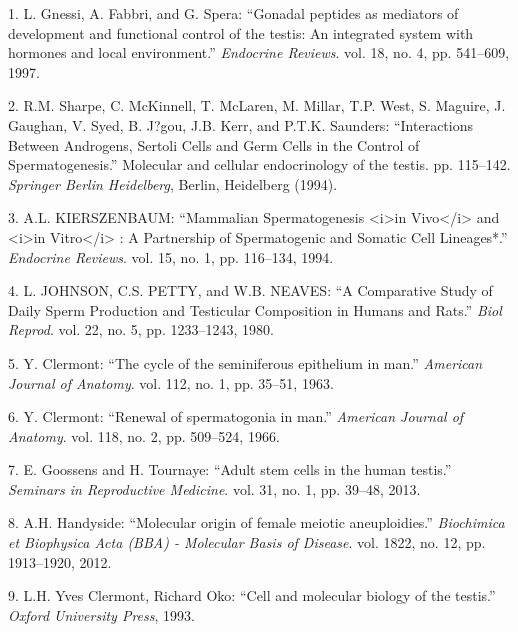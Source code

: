 \documentclass[12pt,twoside]{ugathesis}
\theoremstyle{definition}
\theoremstyle{definition}
\theoremstyle{remark}
\begin{document}
\noindent

\setlength{\parindent}{-0.20in} \setlength{\leftskip}{0.20in}
\setlength{\parskip}{8pt}

\hypertarget{refs}{}
\hypertarget{ref-Gnessi1997}{}
1. L. Gnessi, A. Fabbri, and G. Spera: ``Gonadal peptides as mediators
of development and functional control of the testis: An integrated
system with hormones and local environment.'' \emph{Endocrine Reviews}.
vol. 18, no. 4, pp. 541--609, 1997.

\hypertarget{ref-Sharpe1994}{}
2. R.M. Sharpe, C. McKinnell, T. McLaren, M. Millar, T.P. West, S.
Maguire, J. Gaughan, V. Syed, B. J?gou, J.B. Kerr, and P.T.K. Saunders:
``Interactions Between Androgens, Sertoli Cells and Germ Cells in the
Control of Spermatogenesis.'' Molecular and cellular endocrinology of
the testis. pp. 115--142. \emph{Springer Berlin Heidelberg}, Berlin,
Heidelberg (1994).

\hypertarget{ref-KIERSZENBAUM1994}{}
3. A.L. KIERSZENBAUM: ``Mammalian Spermatogenesis
\textless{}i\textgreater{}in Vivo\textless{}/i\textgreater{} and
\textless{}i\textgreater{}in Vitro\textless{}/i\textgreater{} : A
Partnership of Spermatogenic and Somatic Cell Lineages*.''
\emph{Endocrine Reviews}. vol. 15, no. 1, pp. 116--134, 1994.

\hypertarget{ref-Johnson1980}{}
4. L. JOHNSON, C.S. PETTY, and W.B. NEAVES: ``A Comparative Study of
Daily Sperm Production and Testicular Composition in Humans and Rats.''
\emph{Biol Reprod}. vol. 22, no. 5, pp. 1233--1243, 1980.

\hypertarget{ref-Clermont1963}{}
5. Y. Clermont: ``The cycle of the seminiferous epithelium in man.''
\emph{American Journal of Anatomy}. vol. 112, no. 1, pp. 35--51, 1963.

\hypertarget{ref-Clermont1966}{}
6. Y. Clermont: ``Renewal of spermatogonia in man.'' \emph{American
Journal of Anatomy}. vol. 118, no. 2, pp. 509--524, 1966.

\hypertarget{ref-Goossens2013}{}
7. E. Goossens and H. Tournaye: ``Adult stem cells in the human
testis.'' \emph{Seminars in Reproductive Medicine}. vol. 31, no. 1, pp.
39--48, 2013.

\hypertarget{ref-Handyside2012}{}
8. A.H. Handyside: ``Molecular origin of female meiotic aneuploidies.''
\emph{Biochimica et Biophysica Acta (BBA) - Molecular Basis of Disease}.
vol. 1822, no. 12, pp. 1913--1920, 2012.

\hypertarget{ref-YvesClermontRichardOko1993}{}
9. L.H. Yves Clermont, Richard Oko: ``Cell and molecular biology of the
testis.'' \emph{Oxford University Press}, 1993.
\end{document}
